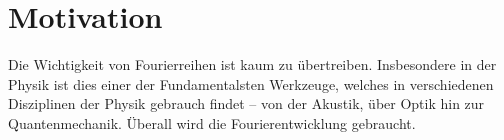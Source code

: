 \section*{Motivation}
\label{sec:Einleitung1}

Die Wichtigkeit von Fourierreihen ist kaum zu übertreiben. Insbesondere in der Physik ist dies einer der Fundamentalsten Werkzeuge, welches in verschiedenen Disziplinen der Physik gebrauch findet -- von der Akustik, über Optik hin zur Quantenmechanik. Überall wird die Fourierentwicklung gebraucht. 


\newpage